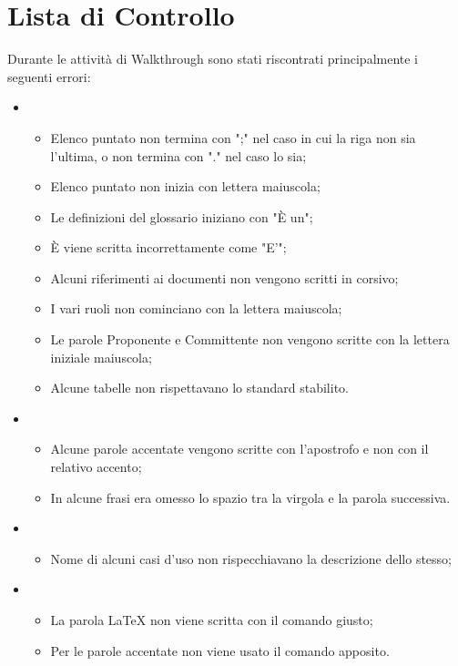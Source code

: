 \appendix
\section{Lista di Controllo}
\label{}
Durante le attività di Walkthrough sono stati riscontrati principalmente i seguenti errori:\\
\begin{itemize}
\item {}
	\begin{itemize}
		\item Elenco puntato non termina con ";" nel caso in cui la riga non sia l'ultima, o non termina con "." nel caso lo sia;
		\item Elenco puntato non inizia con lettera maiuscola;
		\item Le definizioni del glossario iniziano con "È un";
		\item È viene scritta incorrettamente come "E'";
		\item Alcuni riferimenti ai documenti non vengono scritti in corsivo;
		\item I vari ruoli non cominciano con la lettera maiuscola;
		\item Le parole Proponente e Committente non vengono scritte con la lettera iniziale maiuscola;
		\item Alcune tabelle non rispettavano lo standard stabilito.\\
	\end{itemize}
\item {}
	\begin{itemize}
		\item Alcune parole accentate vengono scritte con l'apostrofo e non con il relativo accento;
		\item In alcune frasi era omesso lo spazio tra la virgola e la parola successiva.
	\end{itemize}
\item {}
	\begin{itemize}
		\item Nome di alcuni casi d'uso non rispecchiavano la descrizione dello stesso;
	\end{itemize}
\item \grassetto{\LaTeX{}}
	\begin{itemize}
		\item La parola \LaTeX{} non viene scritta con il comando giusto;
		\item Per le parole accentate non viene usato il comando apposito.
	\end{itemize}
\end{itemize}



